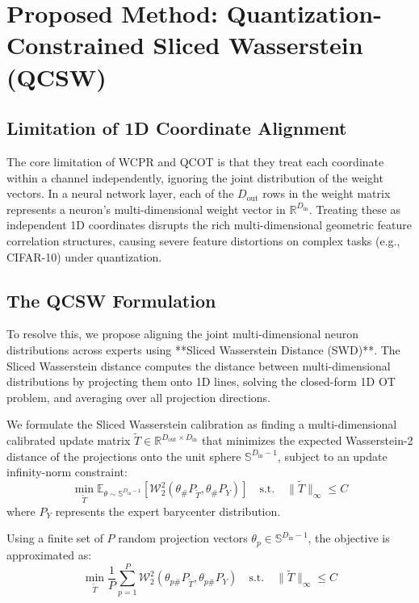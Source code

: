 \documentclass{article}
\theoremstyle{plain}
\theoremstyle{definition}
\theoremstyle{remark}
\begin{document}
\section{Proposed Method: Quantization-Constrained Sliced Wasserstein (QCSW)}
\label{sec:method}

\subsection{Limitation of 1D Coordinate Alignment}
The core limitation of WCPR and QCOT is that they treat each coordinate within a channel independently, ignoring the joint distribution of the weight vectors. In a neural network layer, each of the $D_{\text{out}}$ rows in the weight matrix represents a neuron's multi-dimensional weight vector in $\mathbb{R}^{D_{\text{in}}}$. Treating these as independent 1D coordinates disrupts the rich multi-dimensional geometric feature correlation structures, causing severe feature distortions on complex tasks (e.g., CIFAR-10) under quantization.

\subsection{The QCSW Formulation}
To resolve this, we propose aligning the joint multi-dimensional neuron distributions across experts using **Sliced Wasserstein Distance (SWD)**. The Sliced Wasserstein distance computes the distance between multi-dimensional distributions by projecting them onto 1D lines, solving the closed-form 1D OT problem, and averaging over all projection directions.

We formulate the Sliced Wasserstein calibration as finding a multi-dimensional calibrated update matrix $\tilde{T} \in \mathbb{R}^{D_{\text{out}} \times D_{\text{in}}}$ that minimizes the expected Wasserstein-2 distance of the projections onto the unit sphere $\mathbb{S}^{D_{\text{in}}-1}$, subject to an update infinity-norm constraint:
\begin{equation}
\min_{\tilde{T}} \mathbb{E}_{\theta \sim \mathbb{S}^{D_{\text{in}}-1}} \left[ \mathcal{W}_2^2(\theta_\# P_{\tilde{T}}, \theta_\# P_{Y}) \right] \quad \text{s.t.} \quad \|\tilde{T}\|_\infty \le C
\end{equation}
where $P_Y$ represents the expert barycenter distribution.

Using a finite set of $P$ random projection vectors $\theta_p \in \mathbb{S}^{D_{\text{in}}-1}$, the objective is approximated as:
\begin{equation}
\min_{\tilde{T}} \frac{1}{P} \sum_{p=1}^P \mathcal{W}_2^2(\theta_{p\#} P_{\tilde{T}}, \theta_{p\#} P_{Y}) \quad \text{s.t.} \quad \|\tilde{T}\|_\infty \le C
\end{equation}
\end{document}
